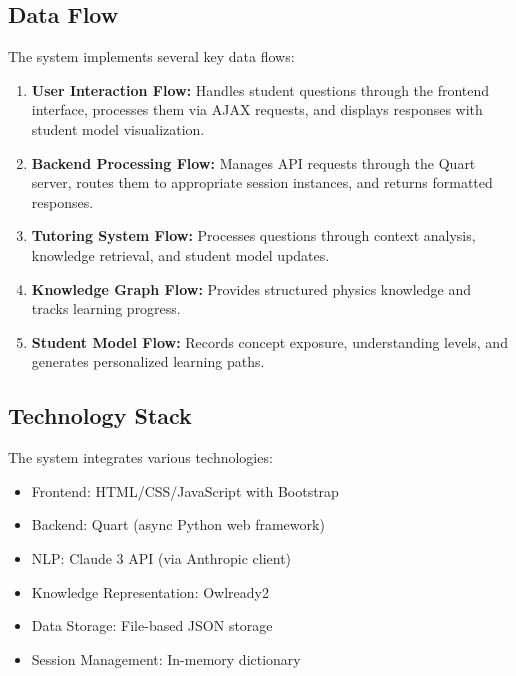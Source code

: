 \documentclass[a4paper,11pt,oneside]{article}
\begin{document}
  \subsection{Data Flow}

  The system implements several key data flows:

  \begin{enumerate}
    \item \textbf{User Interaction Flow:} Handles student questions through the frontend interface, processes them via AJAX requests, 
    and displays responses with student model visualization.
    
    \item \textbf{Backend Processing Flow:} Manages API requests through the Quart server, routes them to appropriate session instances, 
    and returns formatted responses.
    
    \item \textbf{Tutoring System Flow:} Processes questions through context analysis, knowledge retrieval, and student model updates.
    
    \item \textbf{Knowledge Graph Flow:} Provides structured physics knowledge and tracks learning progress.
    
    \item \textbf{Student Model Flow:} Records concept exposure, understanding levels, and generates personalized learning paths.
  \end{enumerate}

  \subsection{Technology Stack}

  The system integrates various technologies:

  \begin{itemize}
    \item Frontend: HTML/CSS/JavaScript with Bootstrap
    \item Backend: Quart (async Python web framework)
    \item NLP: Claude 3 API (via Anthropic client)
    \item Knowledge Representation: Owlready2
    \item Data Storage: File-based JSON storage
    \item Session Management: In-memory dictionary
  \end{itemize}
\end{document}
